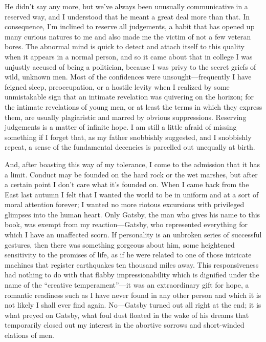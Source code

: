 \documentclass[12pt]{book}
\begin{document}
He didn’t say any more, but we’ve always been unusually communicative
in a reserved way, and I understood that he meant a great deal more
than that. In consequence, I’m inclined to reserve all judgements, a
habit that has opened up many curious natures to me and also made me
the victim of not a few veteran bores. The abnormal mind is quick to
detect and attach itself to this quality when it appears in a normal
person, and so it came about that in college I was unjustly accused of
being a politician, because I was privy to the secret griefs of wild,
unknown men. Most of the confidences were unsought—frequently I have
feigned sleep, preoccupation, or a hostile levity when I realized by
some unmistakable sign that an intimate revelation was quivering on
the horizon; for the intimate revelations of young men, or at least
the terms in which they express them, are usually plagiaristic and
marred by obvious suppressions. Reserving judgements is a matter of
infinite hope. I am still a little afraid of missing something if I
forget that, as my father snobbishly suggested, and I snobbishly
repeat, a sense of the fundamental decencies is parcelled out
unequally at birth.

And, after boasting this way of my tolerance, I come to the admission
that it has a limit. Conduct may be founded on the hard rock or the
wet marshes, but after a certain point I don’t care what it’s founded
on. When I came back from the East last autumn I felt that I wanted
the world to be in uniform and at a sort of moral attention forever; I
wanted no more riotous excursions with privileged glimpses into the
human heart. Only Gatsby, the man who gives his name to this book, was
exempt from my reaction—Gatsby, who represented everything for which I
have an unaffected scorn. If personality is an unbroken series of
successful gestures, then there was something gorgeous about him, some
heightened sensitivity to the promises of life, as if he were related
to one of those intricate machines that register earthquakes ten
thousand miles away. This responsiveness had nothing to do with that
flabby impressionability which is dignified under the name of the
“creative temperament”—it was an extraordinary gift for hope, a
romantic readiness such as I have never found in any other person and
which it is not likely I shall ever find again. No—Gatsby turned out
all right at the end; it is what preyed on Gatsby, what foul dust
floated in the wake of his dreams that temporarily closed out my
interest in the abortive sorrows and short-winded elations of men.
\end{document}
